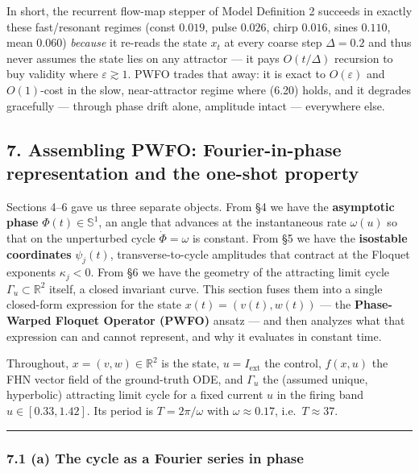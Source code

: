 \documentclass[
  11pt,
]{article}
\providecommand{\lt}{<}
\begin{document}
In short, the recurrent flow-map stepper of Model Definition 2 succeeds
in exactly these fast/resonant regimes (const \(0.019\), pulse
\(0.026\), chirp \(0.016\), sines \(0.110\), mean \(0.060\))
\emph{because} it re-reads the state \(x_t\) at every coarse step
\(\Delta=0.2\) and thus never assumes the state lies on any attractor
--- it pays \(O(t/\Delta)\) recursion to buy validity where
\(\varepsilon\gtrsim1\). PWFO trades that away: it is exact to
\(O(\varepsilon)\) and \(O(1)\)-cost in the slow, near-attractor regime
where (6.20) holds, and it degrades gracefully --- through phase drift
alone, amplitude intact --- everywhere else.

\subsection{7. Assembling PWFO: Fourier-in-phase representation and the
one-shot
property}\label{assembling-pwfo-fourier-in-phase-representation-and-the-one-shot-property}

Sections 4--6 gave us three separate objects. From §4 we have the
\textbf{asymptotic phase} \(\Phi(t)\in\mathbb{S}^1\), an angle that
advances at the instantaneous rate \(\omega(u)\) so that on the
unperturbed cycle \(\dot\Phi=\omega\) is constant. From §5 we have the
\textbf{isostable coordinates} \(\psi_j(t)\), transverse-to-cycle
amplitudes that contract at the Floquet exponents \(\kappa_j\lt 0\).
From §6 we have the geometry of the attracting limit cycle
\(\Gamma_u\subset\mathbb{R}^2\) itself, a closed invariant curve. This
section fuses them into a single closed-form expression for the state
\(x(t)=(v(t),w(t))\) --- the \textbf{Phase-Warped Floquet Operator
(PWFO)} ansatz --- and then analyzes what that expression can and cannot
represent, and why it evaluates in constant time.

Throughout, \(x=(v,w)\in\mathbb{R}^2\) is the state,
\(u=I_{\text{ext}}\) the control, \(f(x,u)\) the FHN vector field of the
ground-truth ODE, and \(\Gamma_u\) the (assumed unique, hyperbolic)
attracting limit cycle for a fixed current \(u\) in the firing band
\(u\in[0.33,1.42]\). Its period is \(T=2\pi/\omega\) with
\(\omega\approx 0.17\), i.e.~\(T\approx 37\).

\begin{center}\rule{0.5\linewidth}{0.5pt}\end{center}

\subsubsection{7.1 (a) The cycle as a Fourier series in
phase}\label{a-the-cycle-as-a-fourier-series-in-phase}
\end{document}
